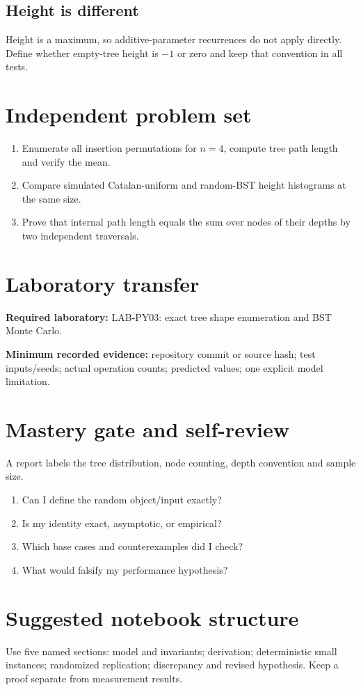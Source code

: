 \documentclass[11pt]{article}
\begin{document}
\subsection{Height is different}
Height is a maximum, so additive-parameter recurrences do not apply directly. Define whether empty-tree height is $-1$ or zero and keep that convention in all tests.
\section{Independent problem set}
\begin{enumerate}
\item Enumerate all insertion permutations for $n=4$, compute tree path length and verify the mean.
\item Compare simulated Catalan-uniform and random-BST height histograms at the same size.
\item Prove that internal path length equals the sum over nodes of their depths by two independent traversals.
\end{enumerate}
\section{Laboratory transfer}
\textbf{Required laboratory:} LAB-PY03: exact tree shape enumeration and BST Monte Carlo.\par
\noindent\textbf{Minimum recorded evidence:} repository commit or source hash; test inputs/seeds; actual operation counts; predicted values; one explicit model limitation.\par
\section{Mastery gate and self-review}
A report labels the tree distribution, node counting, depth convention and sample size.\par
\begin{enumerate}\item Can I define the random object/input exactly? \item Is my identity exact, asymptotic, or empirical? \item Which base cases and counterexamples did I check? \item What would falsify my performance hypothesis?\end{enumerate}
\section{Suggested notebook structure}
Use five named sections: model and invariants; derivation; deterministic small instances; randomized replication; discrepancy and revised hypothesis. Keep a proof separate from measurement results.
\end{document}
